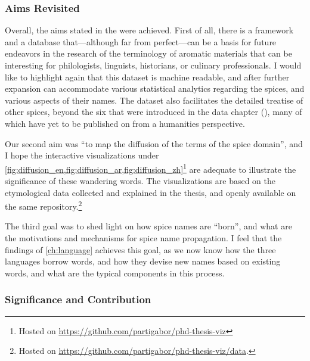     

\subsubsection{Aims Revisited}

Overall, the aims stated in the  were achieved. First of all, there is a framework and a database that---although far from perfect---can be a basis for future endeavors in the research of the terminology of aromatic materials that can be interesting for philologists, linguists, historians, or culinary professionals. I would like to highlight again that this dataset is machine readable, and after further expansion can accommodate various statistical analytics regarding the spices, and various aspects of their names. The dataset also facilitates the detailed treatise of other spices, beyond the six that were introduced in the data chapter (), many of which have yet to be published on from a humanities perspective.

Our second aim was ``to map the diffusion of the terms of the spice domain'', and I hope the interactive visualizations under \cref{fig:diffusion_en,fig:diffusion_ar,fig:diffusion_zh}\footnote{Hosted on \url{https://github.com/partigabor/phd-thesis-viz}} are adequate to illustrate the significance of these wandering words. The visualizations are based on the etymological data collected and explained in the thesis, and openly available on the same repository.\footnote{Hosted on \url{https://github.com/partigabor/phd-thesis-viz/data}.}

The third goal was to shed light on how spice names are ``born'', and what are the motivations and mechanisms for spice name propagation. I feel that the findings of \cref{ch:language} achieves this goal, as we now know how the three languages borrow words, and how they devise new names based on existing words, and what are the typical components in this process.



\subsubsection{Significance and Contribution}

